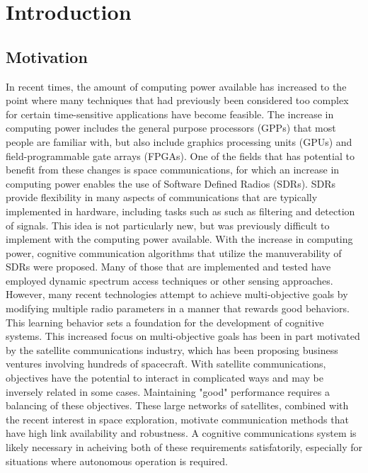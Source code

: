 \chapter{Introduction}
\section{Motivation}
\par In recent times, the amount of computing power available has increased to the point where many techniques that had previously been considered too complex for certain time-sensitive applications have become feasible. The increase in computing power includes the general purpose processors (GPPs) that most people are familiar with, but also include graphics processing units (GPUs) and field-programmable gate arrays (FPGAs). One of the fields that has potential to benefit from these changes is space communications, for which an increase in computing power enables the use of Software Defined Radios (SDRs)\cite{1_and_2_in_tim's_paper}. SDRs provide flexibility in many aspects of communications that are typically implemented in hardware, including tasks such as such as filtering and detection of signals\cite{Software Defined Radio: Architectures, Systems and Functions (Markus Dillinger, Kambiz Madani, Nancy Alonistioti) Page xxxiii (Wiley & Sons, 2003, ISBN 0-470-85164-3)}. This idea is not particularly new, but was previously difficult to implement with the computing power available. With the increase in computing power, cognitive communication algorithms that utilize the manuverability of SDRs were proposed. Many of those that are implemented and tested have employed dynamic spectrum access techniques or other sensing approaches. However, many recent technologies attempt to achieve multi-objective goals by modifying multiple radio parameters in a manner that rewards good behaviors. This learning behavior sets a foundation for the development of cognitive systems. This increased focus on multi-objective goals has been in part motivated by the satellite communications industry, which has been proposing business ventures involving hundreds of spacecraft. With satellite communications, objectives have the potential to interact in complicated ways and may be inversely related in some cases. Maintaining "good" performance requires a balancing of these objectives. These large networks of satellites, combined with the recent interest in space exploration, motivate communication methods that have high link availability and robustness\cite{paulo_thesis_cite_6}. A cognitive communications system is likely necessary in acheiving both of these requirements satisfatorily, especially for situations where autonomous operation is required.

